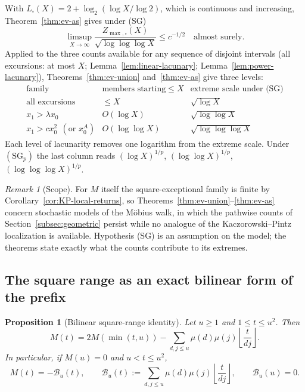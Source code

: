\documentclass[11pt]{amsart}
\numberwithin{equation}{section}
\theoremstyle{plain}
\newtheorem{proposition}[theorem]{Proposition}
\theoremstyle{definition}
\theoremstyle{remark}
\newtheorem{remark}[theorem]{Remark}
\begin{document}
With $L_\square(X)=2+\log_2(\log X/\log2)$, which is continuous and
increasing, Theorem~\ref{thm:ev-as} gives under (SG)
\[
\limsup_{X\to\infty}\frac{Z_{\max,\square}(X)}{\sqrt{\log\log\log X}}\le c^{-1/2}
\quad\text{almost surely.}
\]
Applied to the three counts available for any sequence of disjoint
intervals (all excursions: at most $X$; Lemma~\ref{lem:linear-lacunary};
Lemma~\ref{lem:power-lacunary}), Theorems~\ref{thm:ev-union}
and~\ref{thm:ev-as} give three levels:
\[
\begin{array}{c|c|c}
\text{family} & \text{members starting}\le X & \text{extreme scale under (SG)}\\
\hline
\text{all excursions} & \le X & \sqrt{\log X}\\
x_1>\lambda x_0 & O(\log X) & \sqrt{\log\log X}\\
x_1>cx_0^2\ \ (\text{or }x_0^A) & O(\log\log X) & \sqrt{\log\log\log X}
\end{array}
\]
Each level of lacunarity removes one logarithm from the extreme scale.
Under $(\mathrm{SG}_p)$ the last column reads $(\log X)^{1/p}$,
$(\log\log X)^{1/p}$, $(\log\log\log X)^{1/p}$.

\begin{remark}[Scope]
\label{rem:ev-scope}
For $M$ itself the square-exceptional family is finite by
Corollary~\ref{cor:KP-local-returns}, so
Theorems~\ref{thm:ev-union}--\ref{thm:ev-as} concern stochastic models of
the M\"obius walk, in which the pathwise counts of
Section~\ref{subsec:geometric} persist while no analogue of the
Kaczorowski--Pintz localization is available. Hypothesis (SG) is an
assumption on the model; the theorems state exactly what the counts
contribute to its extremes.
\end{remark}

\subsection{The square range as an exact bilinear form of the prefix}

\begin{proposition}[Bilinear square-range identity]
\label{prop:prefix-bilinear}
Let $u\ge1$ and $1\le t\le u^2$. Then
\begin{equation}
\label{eq:bilinear-general}
M(t)=2M(\min(t,u))-
\sum_{d,j\le u}\mu(d)\mu(j)\left\lfloor\frac{t}{dj}\right\rfloor.
\end{equation}
In particular, if $M(u)=0$ and $u<t\le u^2$,
\begin{equation}
\label{eq:bilinear-excursion}
M(t)=-\mathcal B_u(t),\qquad
\mathcal B_u(t):=\sum_{d,j\le u}\mu(d)\mu(j)
\left\lfloor\frac{t}{dj}\right\rfloor,
\qquad \mathcal B_u(u)=0.
\end{equation}
\end{proposition}
\end{document}
